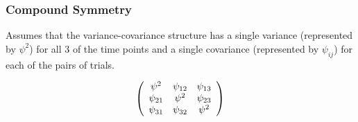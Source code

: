 \documentclass[12pt, a4paper]{report}
\theoremstyle{plain}
\theoremstyle{definition}
\theoremstyle{remark}
\begin{document}
		
		
		\subsubsection{Compound Symmetry}
		
		Assumes that the variance-covariance structure has a single variance (represented by $\psi^2$)
		for all 3 of the time points and a single covariance (represented by $\psi_{ij}$) for each of the pairs of trials.
		
		\[
		\left(%
		\begin{array}{c c c}
		\psi^2 &  \psi_{12} & \psi_{13}   \\
		\psi_{21} & \psi^2 & \psi_{23}   \\
		\psi_{31} & \psi_{32} & \psi^2   \\
		\end{array}%
		\right)
		\]
		
		
		
		
		
		
		
		
		
		
		
\end{document}
